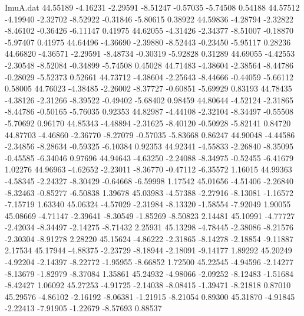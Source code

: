 \begin{filecontents}{ImuA.dat}
  44.55189   -4.16231   -2.29591   -8.51247   -0.57035   -5.74508    0.54188
  44.57512   -4.19940   -2.32702   -8.52922   -0.31846   -5.80615    0.38922
  44.59836   -4.28794   -2.32822   -8.46102   -0.36426   -6.11147    0.41975
  44.62055   -4.31426   -2.34377   -8.51007   -0.18870   -5.97407    0.41975
  44.64496   -4.36690   -2.39880   -8.52443   -0.23450   -5.95117    0.28236
  44.66820   -4.36571   -2.29591   -8.48734   -0.30319   -5.92828    0.31289
  44.69055   -4.42553   -2.30548   -8.52084   -0.34899   -5.74508    0.45028
  44.71483   -4.38604   -2.38564   -8.44786   -0.28029   -5.52373    0.52661
  44.73712   -4.38604   -2.25643   -8.44666   -0.44059   -5.66112    0.58005
  44.76023   -4.38485   -2.26002   -8.37727   -0.60851   -5.69929    0.83193
  44.78435   -4.38126   -2.31266   -8.39522   -0.49402   -5.68402    0.98459
  44.80644   -4.52124   -2.31865   -8.44786   -0.50165   -5.76035    0.92353
  44.82987   -4.44108   -2.32104   -8.34497   -0.55508   -5.70692    0.96170
  44.85343   -4.48894   -2.31625   -8.40120   -0.50928   -5.82141    0.84720
  44.87703   -4.46860   -2.36770   -8.27079   -0.57035   -5.83668    0.86247
  44.90048   -4.44586   -2.34856   -8.28634   -0.59325   -6.10384    0.92353
  44.92341   -4.55833   -2.26840   -8.35095   -0.45585   -6.34046    0.97696
  44.94643   -4.63250   -2.24088   -8.34975   -0.52455   -6.41679    1.02276
  44.96963   -4.62652   -2.23011   -8.36770   -0.47112   -6.35572    1.16015
  44.99363   -4.58345   -2.24327   -8.30429   -0.64668   -6.59998    1.17542
  45.01656   -4.51406   -2.26840   -8.32463   -0.85277   -6.50838    1.39678
  45.03983   -4.57388   -2.27916   -8.13081   -1.16572   -7.15719    1.63340
  45.06324   -4.57029   -2.31984   -8.13320   -1.58554   -7.92049    1.90055
  45.08669   -4.71147   -2.39641   -8.30549   -1.85269   -8.50823    2.14481
  45.10991   -4.77727   -2.42034   -8.34497   -2.14275   -8.71432    2.25931
  45.13298   -4.78445   -2.38086   -8.21576   -2.30304   -8.91278    2.28220
  45.15624   -4.86222   -2.31865   -8.14278   -2.18854   -9.11887    2.17534
  45.17944   -4.88375   -2.23729   -8.18944   -2.18091   -9.14177    1.89292
  45.20249   -4.92204   -2.14397   -8.22772   -1.95955   -8.66852    1.72500
  45.22545   -4.94596   -2.14277   -8.13679   -1.82979   -8.37084    1.35861
  45.24932   -4.98066   -2.09252   -8.12483   -1.51684   -8.42427    1.06092
  45.27253   -4.91725   -2.14038   -8.08415   -1.39471   -8.21818    0.87010
  45.29576   -4.86102   -2.16192   -8.06381   -1.21915   -8.21054    0.89300
  45.31870   -4.91845   -2.22413   -7.91905   -1.22679   -8.57693    0.88537

\end{filecontents}
